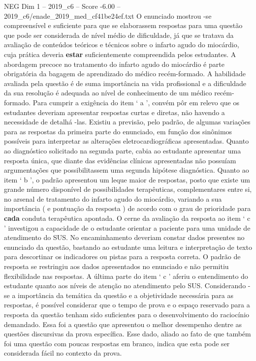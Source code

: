 \begin{textsample}{NEG Dim 1 – 2019\_c6 – Score -6.00 – 2019\_c6/enade\_2019\_med\_cf41be24ef.txt}
O enunciado mostrou -se compreensível e suficiente para que se elaborassem respostas para uma questão que pode ser considerada de nível médio de dificuldade, já que se tratava da avaliação de conteúdos teóricos e técnicos sobre o infarto agudo do miocárdio, cuja prática deveria \textbf{estar} suficientemente compreendida pelos estudantes.
A abordagem precoce no tratamento do infarto agudo do miocárdio é parte obrigatória da bagagem de aprendizado do médico recém-formado.
A habilidade avaliada pela questão é de suma importância na vida profissional e a dificuldade da sua resolução é adequada ao nível de conhecimento de um médico recém-formado.
Para cumprir a exigência do item ‘ a ’, convém pôr em relevo que os estudantes deveriam apresentar respostas curtas e diretas, não havendo a necessidade de detalhá -las.
Existiu a previsão, pelo padrão, de algumas variações para as respostas da primeira parte do enunciado, em função dos sinônimos possíveis para interpretar as alterações eletrocardiográficas apresentadas.
Quanto ao diagnóstico solicitado na segunda parte, cabia ao estudante apresentar uma resposta única, que diante das evidências clínicas apresentadas não possuíam argumentações que possibilitassem uma segunda hipótese diagnóstica.
Quanto ao item ‘ b ’, o padrão apresentou um leque maior de respostas, posto que existe um grande número disponível de possibilidades terapêuticas, complementares entre si, no arsenal de tratamento do infarto agudo do miocárdio, variando a sua importância ( e pontuação da resposta ) de acordo com o grau de prioridade para \textbf{cada} conduta terapêutica apontada.
O cerne da avaliação da resposta ao item ‘ c ’ investigou a capacidade de o estudante orientar a paciente para uma unidade de atendimento do SUS.
No encaminhamento deveriam constar dados presentes no enunciado da questão, bastando ao estudante uma leitura e interpretação de texto para descortinar os indicadores ou pistas para a resposta correta.
O padrão de resposta se restringiu aos dados apresentados no enunciado e não permitiu flexibilidade nas respostas.
A última parte do item ‘ c ’ aferiu o entendimento do estudante quanto aos níveis de atenção no atendimento pelo SUS.
Considerando -se a importância da temática da questão e a objetividade necessária para as respostas, é possível considerar que o tempo de prova e o espaço reservado para a resposta da questão tenham sido suficientes para o desenvolvimento do raciocínio demandado.
Essa foi a questão que apresentou o melhor desempenho dentre as questões discursivas da prova específica.
Esse dado, aliado ao fato de que também foi uma questão com poucas respostas em branco, indica que esta pode ser considerada fácil no contexto da prova.

\end{textsample}
